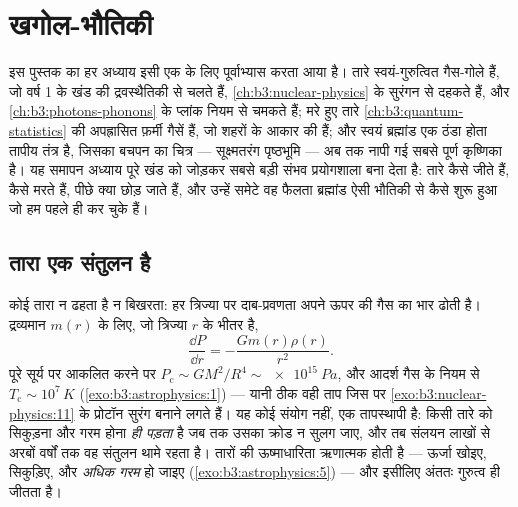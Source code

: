 \chapter{खगोल-भौतिकी}\label{ch:b3:astrophysics}


इस पुस्तक का हर अध्याय इसी एक के लिए पूर्वाभ्यास करता आया है। तारे
स्वयं-गुरुत्वित गैस-गोले हैं, जो वर्ष 1 के खंड की द्रवस्थैतिकी से चलते
हैं, \cref{ch:b3:nuclear-physics} के सुरंगन से दहकते हैं, और
\cref{ch:b3:photons-phonons} के प्लांक नियम से चमकते हैं; मरे हुए तारे
\cref{ch:b3:quantum-statistics} की अपह्रासित फ़र्मी गैसें हैं, जो
शहरों के आकार की हैं; और स्वयं ब्रह्मांड एक ठंडा होता तापीय तंत्र है,
जिसका बचपन का चित्र --- सूक्ष्मतरंग पृष्ठभूमि --- अब तक नापी गई सबसे
पूर्ण कृष्णिका है। यह समापन अध्याय पूरे खंड को जोड़कर सबसे बड़ी संभव
प्रयोगशाला बना देता है: तारे कैसे जीते हैं, कैसे मरते हैं, पीछे क्या
छोड़ जाते हैं, और उन्हें समेटे वह फैलता ब्रह्मांड ऐसी भौतिकी से कैसे
शुरू हुआ जो हम पहले ही कर चुके हैं।

\section{तारा एक संतुलन है}

\begin{proposition}[द्रवस्थैतिक संतुलन]\label{prop:b3:astrophysics:hydrostatic}
कोई तारा न ढहता है न बिखरता: हर त्रिज्या पर दाब-प्रवणता अपने ऊपर की
गैस का भार ढोती है। द्रव्यमान $m(r)$ के लिए, जो त्रिज्या
$r$ के भीतर है,
\[
\frac{\dd P}{\dd r} = -\frac{Gm(r)\rho(r)}{r^2} .
\]
पूरे सूर्य पर आकलित करने पर $P_{\text{c}} \sim GM^2/R^4 \sim
\qty{e15}{Pa}$, और आदर्श गैस के नियम से $T_{\text{c}} \sim
10^7\,\unit{K}$ (\cref{exo:b3:astrophysics:1}) --- यानी ठीक वही
ताप जिस पर \cref{exo:b3:nuclear-physics:11} के प्रोटॉन
सुरंग बनाने लगते हैं। यह कोई संयोग नहीं, एक तापस्थापी है: किसी तारे को
सिकुड़ना और गरम होना \emph{ही पड़ता} है जब तक उसका क्रोड न सुलग जाए,
और तब संलयन लाखों से अरबों वर्षों तक वह संतुलन थामे रहता है। तारों की
ऊष्माधारिता ऋणात्मक होती है --- ऊर्जा खोइए, सिकुड़िए, और
\emph{अधिक गरम} हो जाइए (\cref{exo:b3:astrophysics:5}) --- और
इसीलिए अंततः गुरुत्व ही जीतता है।
\end{proposition}

